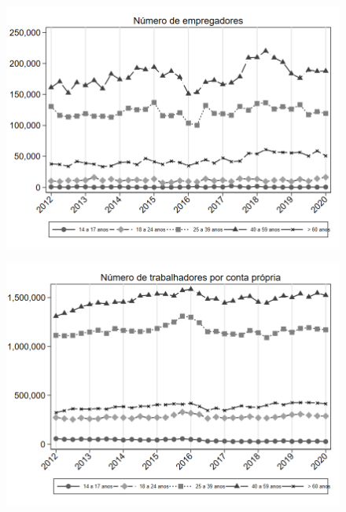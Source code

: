 \begin{frame}[label=_composicao_demografica_faixa_etaria_n_empregador]{}
\textit{\hyperlink{_composicao_demografica_faixa_etaria}{}}
\begin{figure}
  \centering
  \includegraphics[width=1.0\linewidth]{../../analysis/output/composicao_demografica/faixa_etaria/_composicao_demografica_faixa_etaria_n_empregador.png}
  \caption{}
  \label{fig:_composicao_demografica_faixa_etaria_n_empregador}
\end{figure}
\end{frame}



\begin{frame}[label=_composicao_demografica_faixa_etaria_n_cpropria]{}
\textit{\hyperlink{_composicao_demografica_faixa_etaria}{}}
\begin{figure}
  \centering
  \includegraphics[width=1.0\linewidth]{../../analysis/output/composicao_demografica/faixa_etaria/_composicao_demografica_faixa_etaria_n_cpropria.png}
  \caption{}
  \label{fig:_composicao_demografica_faixa_etaria_n_cpropria}
\end{figure}
\end{frame}

